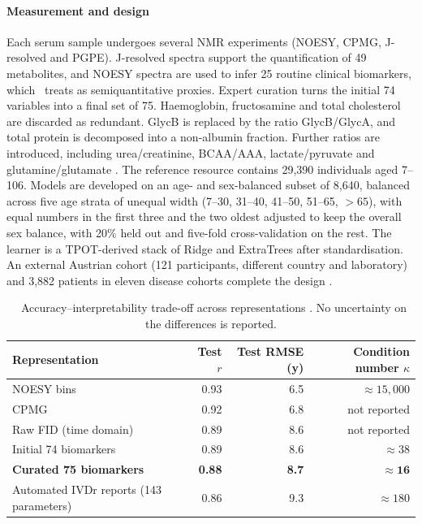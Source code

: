 \documentclass[11pt,a4paper]{article}
\theoremstyle{plain}
\theoremstyle{definition}
\theoremstyle{remark}
\newcommand{\tagbox}[2]{\tcbox[on line,boxsep=1pt,left=2pt,right=2pt,top=0pt,bottom=0pt,
  colback=#1!12!white,colframe=#1,boxrule=0.4pt,arc=1pt]{\scriptsize\bfseries\color{#1}#2}}
\newcommand{\REP}{\tagbox{teal}{REPORTED}}
\begin{document}
\paragraph{Measurement and design} \REP
Each serum sample undergoes several NMR experiments (NOESY, CPMG, J-resolved and PGPE). J-resolved spectra support the quantification of 49 metabolites, and NOESY spectra are used to infer 25 routine clinical biomarkers, which \PI\ treats as semiquantitative proxies. Expert curation turns the initial 74 variables into a final set of 75. Haemoglobin, fructosamine and total cholesterol are discarded as redundant. GlycB is replaced by the ratio GlycB/GlycA, and total protein is decomposed into a non-albumin fraction. Further ratios are introduced, including urea/creatinine, BCAA/AAA, lactate/pyruvate and glutamine/glutamate \PI[pp.~4--5, 12--13].
The reference resource contains 29,390 individuals aged 7--106. Models are developed on an age- and sex-balanced subset of 8,640, balanced across five age strata of unequal width (7--30, 31--40, 41--50, 51--65, $>65$), with equal numbers in the first three and the two oldest adjusted to keep the overall sex balance, with 20\% held out and five-fold cross-validation on the rest. The learner is a TPOT-derived stack of Ridge and ExtraTrees after standardisation. An external Austrian cohort (121 participants, different country and laboratory) and 3,882 patients in eleven disease cohorts complete the design \PI[pp.~3--6, 12--13].

\begin{table}[h]
\centering\small
\begin{tabular}{@{}lrrr@{}}
\toprule
Representation & Test $r$ & Test RMSE (y) & Condition number $\kappa$\\
\midrule
NOESY bins & 0.93 & 6.5 & $\approx15{,}000$\\
CPMG & 0.92 & 6.8 & not reported\\
Raw FID (time domain) & 0.89 & 8.6 & not reported\\
Initial 74 biomarkers & 0.89 & 8.6 & $\approx38$\\
\rowcolor{teal!8}\textbf{Curated 75 biomarkers} & \textbf{0.88} & \textbf{8.7} & $\boldsymbol{\approx16}$\\
Automated IVDr reports (143 parameters) & 0.86 & 9.3 & $\approx180$\\
\bottomrule
\end{tabular}
\caption{\REP\ Accuracy--interpretability trade-off across representations \PI[pp.~4--5]. No uncertainty on the differences is reported.}
\label{tab:P1repr}
\end{table}
\end{document}
